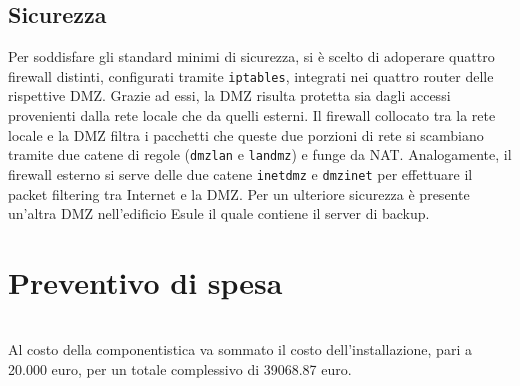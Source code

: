 \documentclass[]{scrartcl}
\def\code#1{\texttt{#1}}
\begin{document}
\subsection{Sicurezza}
Per soddisfare gli standard minimi di sicurezza, si è scelto di adoperare quattro firewall distinti, configurati tramite \code{iptables}, integrati nei quattro router delle rispettive DMZ. Grazie ad essi, la DMZ risulta protetta sia dagli accessi provenienti dalla rete locale che da quelli esterni. Il firewall collocato tra la rete locale e la DMZ filtra i pacchetti che queste due porzioni di rete si scambiano tramite due catene di regole (\code{dmzlan} e \code{landmz}) e funge da NAT. Analogamente, il firewall esterno si serve delle due catene \code{inetdmz} e \code{dmzinet} per effettuare il packet filtering tra Internet e la DMZ. Per un ulteriore sicurezza è presente un'altra DMZ nell'edificio Esule il quale contiene il server di backup.
\section{Preventivo di spesa}

\begin{table}[H]
	\centering
	\label{costo componentistica}
	\caption{Costo delle componenti hardware}
\end{table}
\ \\Al costo della componentistica va sommato il costo dell'installazione, pari a 20.000 euro, per un totale complessivo di 39068.87 euro.
\end{document}
